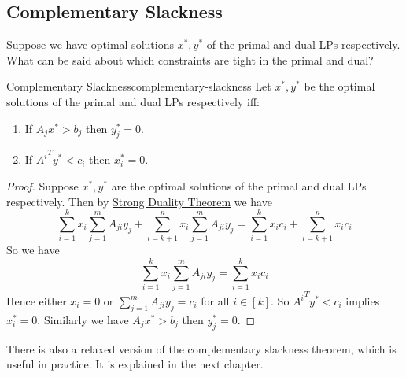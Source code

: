 \subsection{Complementary Slackness}
\begin{question}{}{}
	Suppose we have optimal solutions $x^*,y^*$ of the primal and dual LPs respectively. What can be said about which constraints are tight in the primal and dual?
\end{question}
\begin{Theorem}{Complementary Slackness}{complementary-slackness}
	Let $x^*,y^*$ be the optimal solutions of the primal and dual LPs respectively iff:
	\begin{enumerate}[label=(\roman*)]
		\item If $A_jx^*>b_j$ then $y_j^*=0$.
		\item If ${A^i}^Ty^*<c_i$ then $x_i^*=0$.
	\end{enumerate}
\end{Theorem}
\begin{proof}
	Suppose $x^*,y^*$ are the optimal solutions of the primal and dual LPs respectively. Then by \hyperref[th:strong-duality]{Strong Duality Theorem}  we have $$\sum\limits_{i=1}^k x_i\sum\limits_{j=1}^m A_{ji}y_j+\sum\limits_{i=k+1}^n x_i\sum\limits_{j=1}^m A_{ji}y_j=\sum\limits_{i=1}^k x_ic_i+\sum\limits_{i=k+1}^n x_ic_i$$So we have $$\sum\limits_{i=1}^k x_i\sum\limits_{j=1}^m A_{ji}y_j=\sum\limits_{i=1}^k x_ic_i$$Hence either $x_i=0$ or $\sum\limits_{j=1}^m A_{ji}y_j=c_i$ for all $i\in[k]$. So ${A^i}^Ty^*<c_i$ implies $x_i^*=0$. Similarly we have $A_jx^*>b_j$ then $y_j^*=0$.
\end{proof}

There is also a relaxed version of the complementary slackness theorem,  which is useful in practice. It is explained in the next chapter.
